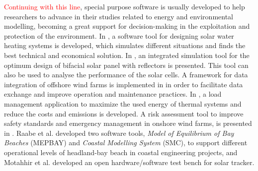 \documentclass[energies,article,submit,moreauthors,pdftex]{Definitions/mdpi}
\begin{document}
		\textcolor{red}{Continuing with this line}, special purpose software is usually developed to help researchers to advance in their studies related to energy and environmental modelling, becoming a great support for decision-making in the exploitation and protection of the environment. In \cite{CAMARGONOGUEIRA2016361}, a software tool for designing solar water heating systems is developed, which simulates different situations and finds the best technical and economical solution. In \cite{LO2015293}, an integrated simulation tool for the optimum design of bifacial solar panel with reflectors is presented. This tool can also be used to analyse the performance of the solar cells. A framework for data integration of offshore wind farms is implemented in \cite{NGUYEN2013150} in order to facilitate data exchange and improve operation and maintenance practices. In \cite{SHEHADEH2020100644}, a load management application to maximize the used energy of thermal systems and reduce the costs and emissions is developed. A risk assessment tool to improve safety standards and emergency management in onshore wind farms, is presented in \cite{ASTIASOGARCIA201648}. Raabe et al. \cite{RAABE2010213} developed two software tools, \textit{Model of Equilibrium of Bay Beaches} (MEPBAY) and \textit{Coastal Modelling System} (SMC), to support different operational levels of headland-bay beach in coastal engineering projects, and Motahhir et al. \cite{MOTAHHIR20199} developed an open hardware/software test bench for solar tracker.
		
\end{document}

